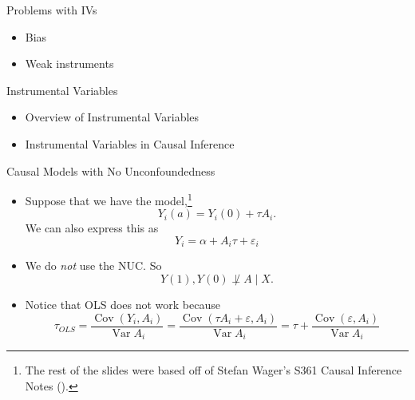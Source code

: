 \documentclass[handout]{beamer} %
\DeclareMathOperator*{\Cov}{Cov}
\DeclareMathOperator*{\Var}{Var}
\begin{document}
\begin{frame}{Problems with IVs}

  \begin{itemize}
    \item<2-> Bias
    \item<3-> Weak instruments
  \end{itemize}
  
\end{frame}

\begin{frame}{Instrumental Variables}

{

\begin{itemize}
    \item<0> Overview of Instrumental Variables
    \item<1> Instrumental Variables in Causal Inference
\end{itemize}
}

\end{frame}

\begin{frame}{Causal Models with No Unconfoundedness}

  \begin{itemize}
    \item Suppose that we have the model,\footnote{The rest of the slides were
      based off of Stefan Wager's S361 Causal Inference Notes
      (\cite{wager2020stats}).}
      \[Y_i(a) = Y_i(0) + \tau A_i.\]
      We can also express this as 
      \[Y_i = \alpha + A_i \tau + \varepsilon_i\]
    \item We do \textit{not} use the NUC. So 
      \[Y(1), Y(0) \not\perp A \mid X.\]
    \item Notice that OLS does not work because
      \[\tau_{OLS} = \frac{\Cov(Y_i, A_i)}{\Var{A_i}} = 
      \frac{\Cov(\tau A_i + \varepsilon, A_i)}{\Var{A_i}} =
      \tau + 
      \frac{\Cov(\varepsilon, A_i)}{\Var{A_i}}\]
  \end{itemize}
  
\end{frame}
\end{document}
